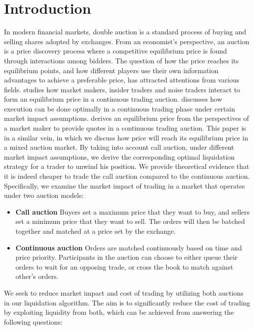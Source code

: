 \section{Introduction}
In modern financial markets, double auction is a standard process of buying and selling shares adopted by exchanges. From an economist's perspective, an auction is a price discovery process where a competitive equilibrium price is found through interactions among bidders. The question of how the price reaches its equilibrium points, and how different players use their own information advantages to achieve a preferable price, has attracted attentions from various fields. \cite{Kyle1985} studies how market makers, insider traders and noise traders interact to form an equilibrium price in a continuous trading auction. \cite{Almgren2000} discusses how execution can be done optimally in a continuous trading phase under certain market impact assumptions. \cite{Avellaneda2008} derives an equilibrium price from the perspectives of a market maker to provide quotes in a continuous trading auction. This paper is in a similar vein, in which we discuss how price will reach its equilibrium price in a mixed auction market. By taking into account call auction, under different market impact assumptions, we derive the corresponding optimal liquidation strategy for a trader to unwind his position. We provide theoretical evidence that it is indeed cheaper to trade the call auction compared to the continuous auction. Specifically, we examine the market impact of trading in a market that operates under two auction models:

\begin{itemize}
  \item \textbf{Call auction} Buyers set a maximum price that they want to buy, and sellers set a minimum price that they want to sell. The orders will then be batched together and matched at a price set by the exchange.
  \item \textbf{Continuous auction} Orders are matched continuously based on time and price priority. Participants in the auction can choose to either queue their orders to wait for an opposing trade, or cross the book to match against other's orders.
\end{itemize}

We seek to reduce market impact and cost of trading by utilizing both auctions in our liquidation algorithm. The aim is to significantly reduce the cost of trading by exploiting liquidity from both, which can be achieved from answering the following questions:

